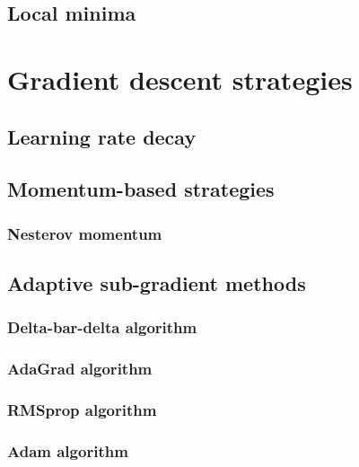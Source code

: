 \subsection{Local minima}


\section{Gradient descent strategies}

\subsection{Learning rate decay}


\subsection{Momentum-based strategies}

\subsubsection{Nesterov momentum}


\subsection{Adaptive sub-gradient methods}

\subsubsection{Delta-bar-delta algorithm}

\subsubsection{AdaGrad algorithm}

\subsubsection{RMSprop algorithm}

\subsubsection{Adam algorithm}

